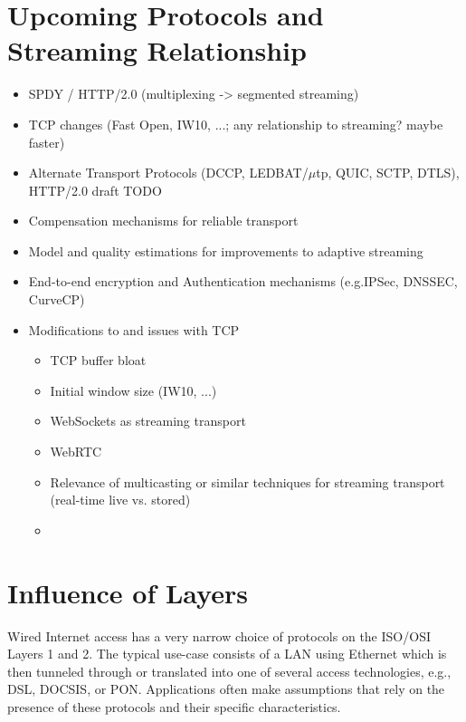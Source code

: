 \section{Upcoming Protocols and Streaming Relationship}

\begin{itemize}
\item SPDY / \gls{HTTP}/2.0 (multiplexing -> segmented streaming)
\item \gls{TCP} changes (Fast Open, IW10, ...; any relationship to streaming? maybe faster)
\item Alternate Transport Protocols (DCCP\cite{rfc4340}, LEDBAT\cite{rfc6817}/$\mu$tp\cite{bt2010utp}, QUIC, SCTP, DTLS), HTTP/2.0 draft TODO
\end{itemize}


\begin{itemize}
\item Compensation mechanisms for reliable transport
\item Model and quality estimations for improvements to adaptive streaming
\item End-to-end encryption and Authentication mechanisms (e.g.IPSec, DNSSEC, CurveCP) %
\item Modifications to and issues with \gls{TCP}
 \begin{itemize}
 \item \gls{TCP} buffer bloat
 \item Initial window size (IW10, ...)
 \item WebSockets as streaming transport \cite{w3c2011websockets} \cite{heise2011websockets}
 \item WebRTC
 \item Relevance of multicasting or similar techniques for streaming transport (real-time live vs. stored)
  
 \item
 \end{itemize}
 \end{itemize}


\section{Influence of Layers}
\label{c5:crosslayerhinting}


Wired Internet access has a very narrow choice of protocols on the \gls{ISO}/\gls{OSI} Layers 1 and 2. The typical use-case consists of a \gls{LAN} using Ethernet which is then tunneled through or translated into one of several access technologies, e.g., \gls{DSL}, \gls{DOCSIS}, or \gls{PON}. Applications often make assumptions that rely on the presence of these protocols and their specific characteristics.

